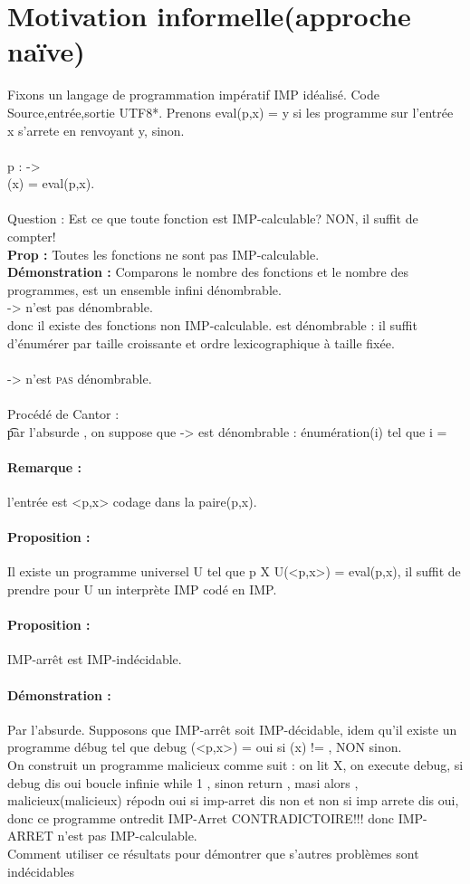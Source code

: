 \documentclass{report}
\begin{document}
\section{Motivation informelle(approche naïve)}Fixons un langage de programmation impératif IMP idéalisé. Code Source,entrée,sortie \in UTF8*. Prenons eval(p,x) = y si les programme sur l'entrée x s'arrete en renvoyant y, \perp sinon.\\\\\phi p : \sigma * -> \sigma *\\\phi (x) = eval(p,x).\\\\Question : Est ce que toute fonction est IMP-calculable? NON, il suffit de compter!\\\textbf{Prop : }Toutes les fonctions ne sont pas IMP-calculable.\\\textbf{Démonstration : }Comparons le nombre des fonctions et le nombre des programmes, \sigma * est un ensemble infini dénombrable.\\\sigma * -> \sigma * n'est pas dénombrable.\\donc il existe des fonctions non IMP-calculable. \sigma *  est dénombrable : il suffit d'énumérer par taille croissante et ordre lexicographique à taille fixée.\\\\\sigma * -> \sigma * n'est  \textsc{pas} dénombrable.\\\\Procédé de Cantor : \\\t par l'absurde , on suppose que \sigma * -> \sigma * est dénombrable : énumération(\phi i) tel que { \phi i} = \sigma * \sigma * 
\paragraph{Remarque : }l'entrée est <p,x> codage dans la paire(p,x).
\paragraph{Proposition : }Il existe un programme universel U tel que \forall p \forall X U(<p,x>) = eval(p,x), il suffit de prendre pour U un interprète IMP codé en IMP.
\paragraph{Proposition  : }IMP-arrêt est IMP-indécidable.
\paragraph{Démonstration : }Par l'absurde. Supposons que IMP-arrêt soit IMP-décidable, idem qu'il existe un programme débug tel que \phi debug (<p,x>) = {oui si \phip(x) != \perp, NON sinon}.\\On construit un programme malicieux comme suit :  on lit X, on execute debug, si debug dis oui boucle infinie while 1 , sinon return , masi alors , \phi malicieux(malicieux) répodn oui si imp-arret dis non et non si imp arrete dis oui, donc ce programme ontredit IMP-Arret CONTRADICTOIRE!!! donc IMP-ARRET n'est pas IMP-calculable.\\Comment utiliser ce résultats pour démontrer que s'autres problèmes sont indécidables
\end{document}

